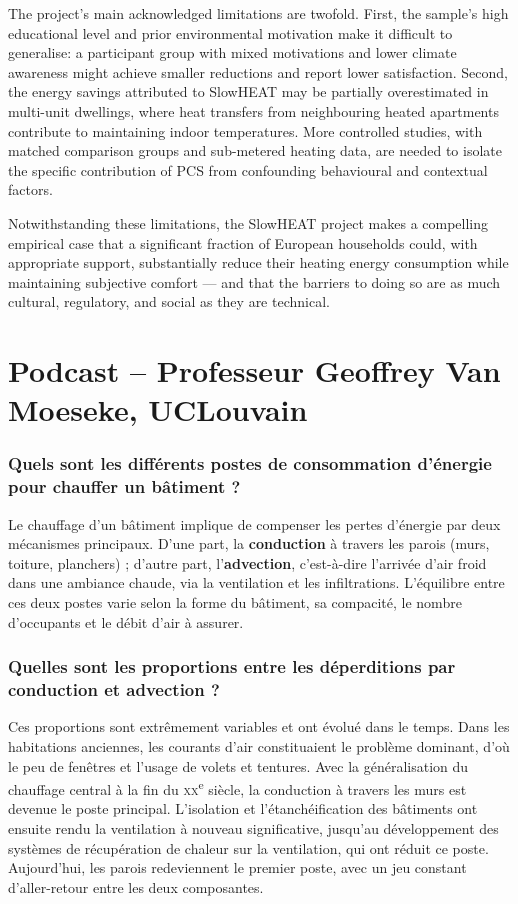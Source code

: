 The project's main acknowledged limitations are twofold. First,
the sample's high educational level and prior environmental
motivation make it difficult to generalise: a participant group
with mixed motivations and lower climate awareness might achieve
smaller reductions and report lower satisfaction. Second, the
energy savings attributed to SlowHEAT may be partially
overestimated in multi-unit dwellings, where heat transfers from
neighbouring heated apartments contribute to maintaining indoor
temperatures. More controlled studies, with matched comparison
groups and sub-metered heating data, are needed to isolate the
specific contribution of PCS from confounding behavioural and
contextual factors.

Notwithstanding these limitations, the SlowHEAT project makes a
compelling empirical case that a significant fraction of European
households could, with appropriate support, substantially reduce
their heating energy consumption while maintaining subjective
comfort --- and that the barriers to doing so are as much
cultural, regulatory, and social as they are technical.




\section{Podcast -- Professeur Geoffrey Van Moeseke, UCLouvain}

\subsubsection{Quels sont les différents postes de consommation d'énergie pour chauffer un bâtiment ?}

Le chauffage d'un bâtiment implique de compenser les pertes d'énergie par deux mécanismes principaux. D'une part, la \textbf{conduction} à travers les parois (murs, toiture, planchers) ; d'autre part, l'\textbf{advection}, c'est-à-dire l'arrivée d'air froid dans une ambiance chaude, via la ventilation et les infiltrations. L'équilibre entre ces deux postes varie selon la forme du bâtiment, sa compacité, le nombre d'occupants et le débit d'air à assurer.

\subsubsection{Quelles sont les proportions entre les déperditions par conduction et advection ?}

Ces proportions sont extrêmement variables et ont évolué dans le temps. Dans les habitations anciennes, les courants d'air constituaient le problème dominant, d'où le peu de fenêtres et l'usage de volets et tentures. Avec la généralisation du chauffage central à la fin du \textsc{xx}\textsuperscript{e} siècle, la conduction à travers les murs est devenue le poste principal. L'isolation et l'étanchéification des bâtiments ont ensuite rendu la ventilation à nouveau significative, jusqu'au développement des systèmes de récupération de chaleur sur la ventilation, qui ont réduit ce poste. Aujourd'hui, les parois redeviennent le premier poste, avec un jeu constant d'aller-retour entre les deux composantes.

